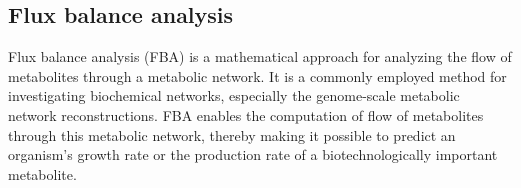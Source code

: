 





\subsection{Flux balance analysis}

Flux balance analysis (FBA) is a mathematical approach for analyzing the flow of metabolites through a metabolic network. It is a commonly employed method for investigating biochemical networks, especially the genome-scale metabolic network reconstructions. FBA enables the computation of flow of metabolites through this metabolic network, thereby making it possible to predict an organism's growth rate or the production rate of a biotechnologically important metabolite. \cite{Orth2010}

